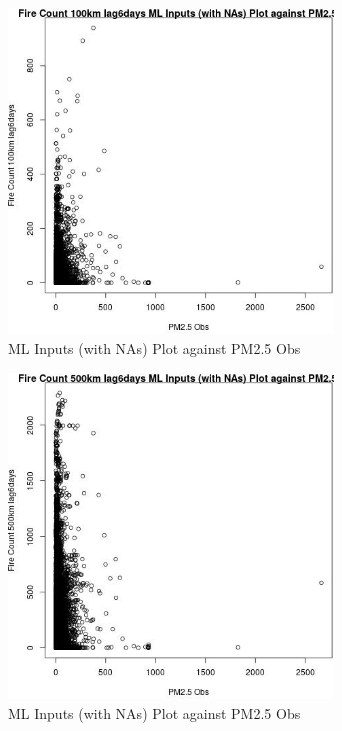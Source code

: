 \begin{figure} 
\centering  
\includegraphics[width=0.77\textwidth]{Code_Outputs/Report_ML_input_PM25_Step4_part_e_de_duplicated_aves_compiled_2019-05-21wNAs_Fire_Count_100km_lag6daysvPM25_Obs.jpg} 
\caption{\label{fig:Report_ML_input_PM25_Step4_part_e_de_duplicated_aves_compiled_2019-05-21wNAsFire_Count_100km_lag6daysvPM25_Obs}ML Inputs (with NAs) Plot against PM2.5 Obs} 
\end{figure} 
 

\begin{figure} 
\centering  
\includegraphics[width=0.77\textwidth]{Code_Outputs/Report_ML_input_PM25_Step4_part_e_de_duplicated_aves_compiled_2019-05-21wNAs_Fire_Count_500km_lag6daysvPM25_Obs.jpg} 
\caption{\label{fig:Report_ML_input_PM25_Step4_part_e_de_duplicated_aves_compiled_2019-05-21wNAsFire_Count_500km_lag6daysvPM25_Obs}ML Inputs (with NAs) Plot against PM2.5 Obs} 
\end{figure} 
 

